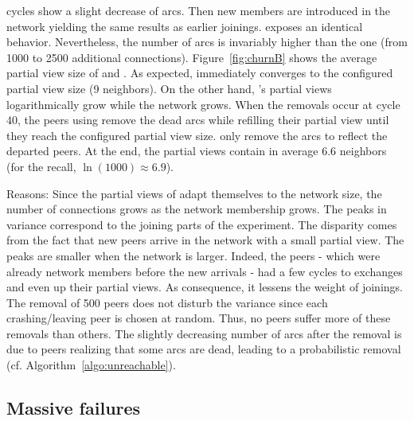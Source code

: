 \begin{asparadesc}
  cycles show a slight decrease of arcs. Then new members are introduced in the
  network yielding the same results as earlier joinings. \CYCLON exposes an
  identical behavior. Nevertheless, the number of arcs is invariably higher
  than the \SPRAY one (from 1000 to 2500 additional
  connections). Figure~\ref{fig:churnB} shows the average partial view size of
  \SPRAY and \CYCLON. As expected, \CYCLON immediately converges to the
  configured partial view size (9 neighbors). On the other hand, \SPRAY's
  partial views logarithmically grow while the network grows. When the removals
  occur at cycle 40, the peers using \CYCLON remove the dead arcs while
  refilling their partial view until they reach the configured partial view
  size. \SPRAY only remove the arcs to reflect the departed peers. At the end,
  the \SPRAY partial views contain in average 6.6 neighbors (for the recall,
  $\ln(1000)\approx 6.9$).
\item[Reasons:] Since the partial views of \SPRAY adapt themselves to the
  network size, the number of connections grows as the network membership
  grows.  The peaks in variance correspond to the joining parts of the
  experiment. The disparity comes from the fact that new peers arrive in the
  network with a small partial view. The peaks are smaller when the network is
  larger. Indeed, the peers - which were already network members before the new
  arrivals - had a few cycles to exchanges and even up their partial views. As
  consequence, it lessens the weight of joinings. The removal of 500 peers does
  not disturb the variance since each crashing/leaving peer is chosen at
  random. Thus, no peers suffer more of these removals than others. The
  slightly decreasing number of arcs after the removal is due to peers
  realizing that some arcs are dead, leading to a probabilistic removal
  (cf. Algorithm~\ref{algo:unreachable}). 
\end{asparadesc}

\subsection{Massive failures}
\label{subsec:resilience}

